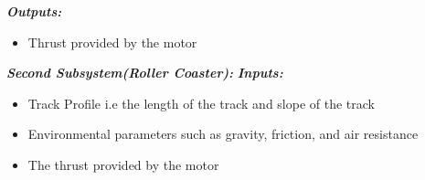 \documentclass{article}
\begin{document}
    \textbf{\textit{Outputs:}}
    \begin{itemize}
        \item Thrust provided by the motor
    \end{itemize}
    \textbf{\textit{Second Subsystem(Roller Coaster):}}
    \newline
    \textbf{\textit{Inputs:}}
    \begin{itemize}
        \item Track Profile i.e the length of the track and slope of the track

        \item Environmental parameters such as gravity, friction, and air resistance

        \item The thrust provided by the motor
    \end{itemize}
\end{document}
